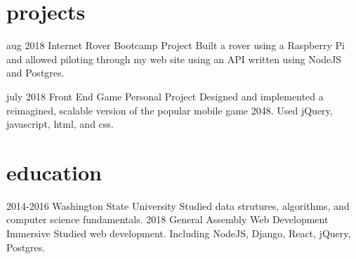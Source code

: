 \documentclass[]{friggeri-cv}
\begin{document}
\section{projects}

\begin{entrylist}

  \entry
    {aug 2018}
    {Internet Rover}
    {Bootcamp Project}
    {Built a rover using a Raspberry Pi and allowed piloting through my web site using an API written using NodeJS and Postgres.}

  \entry
    {july 2018}
    {Front End Game}
    {Personal Project}
    {Designed and implemented a reimagined, scalable version of the popular mobile game 2048. Used jQuery, javascript, html, and css.}

\end{entrylist}


\section{education}

\begin{entrylist}
  \entry
    {2014-2016}
    {Washington State University}
    {}
    {Studied data strutures, algorithms, and computer science fundamentals.}
  \entry
    {2018}
    {General Assembly}
    {Web Development Immersive}
    {Studied web development. Including NodeJS, Django, React, jQuery, Postgres.}

\end{entrylist}
\end{document}
